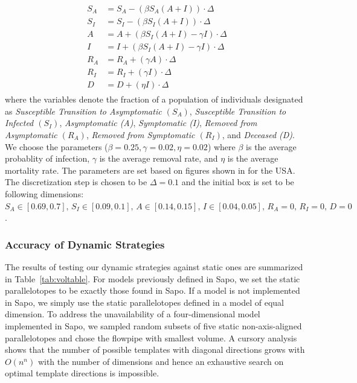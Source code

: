 \begin{align}
  \begin{split}
   S_A & = S_A  -(\beta S_A(A+I))\cdot \Delta \\
   S_I & = S_I  -(\beta S_I (A + I))\cdot \Delta \\
   A & = A + (\beta S_I(A+I) - \gamma I)\cdot \Delta \\
   I & = I + (\beta S_I (A+I) - \gamma I)\cdot  \Delta \\
   R_A & = R_A + (\gamma A)\cdot \Delta \\
   R_I & = R_I + (\gamma I)\cdot \Delta \\
   D & = D + (\eta I)\cdot \Delta
  \end{split}
\end{align}
where the variables denote the fraction of a population of individuals designated as \emph{Susceptible Transition to Asymptomatic $(S_A)$}, \emph{Susceptible Transition to Infected $(S_I)$}, \emph{Asymptomatic (A)}, \emph{Symptomatic (I)}, \emph{Removed from Asymptomatic $(R_A)$}, \emph{Removed from Symptomatic $(R_I)$}, and \emph{Deceased (D)}. We choose the parameters ($\beta = 0.25, \gamma=0.02, \eta=0.02$) where $\beta$ is the average probablity of infection, $\gamma$ is the average removal rate, and $\eta$ is the average mortality rate. The parameters are set based on figures shown in \cite{ansumali2020modelling} for the USA. The discretization step is chosen to be $\Delta = 0.1$ and the initial box is set to be following dimensions: $S_A  \in [0.69, 0.7], \, S_I \in [0.09, 0.1], \, A \in [0.14, 0.15], \, I \in [0.04, 0.05], \, R_A  = 0,\, R_I  = 0, \, D  = 0$.

\subsubsection{Accuracy of Dynamic Strategies}
The results of testing our dynamic strategies against static ones are summarized in Table~\ref{tab:voltable}. For models previously defined in Sapo, we set the static parallelotopes to be exactly those found in Sapo.
If a model is not implemented in Sapo, we simply use the static parallelotopes defined in a model of equal dimension. To address the unavailability of a four-dimensional model implemented in Sapo, we sampled random subsets of five static non-axis-aligned parallelotopes and chose the flowpipe with smallest volume.
%
%
A cursory analysis shows that the number of possible templates with diagonal directions grows with $O(n^n)$ with the number of dimensions and hence an exhaustive search on optimal template directions is impossible.

